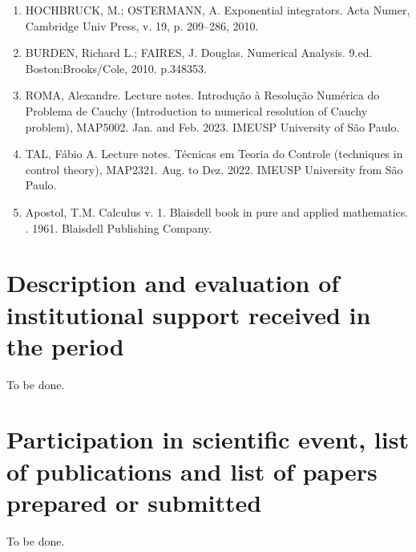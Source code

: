 \documentclass[letterpaper,10pt,english]{jupyterBook}
\begin{document}
\sphinxstepscope
\begin{enumerate}
%
\item {} 
\sphinxAtStartPar
HOCHBRUCK, M.; OSTERMANN, A. Exponential integrators. Acta Numer, Cambridge Univ Press, v. 19, p. 209–286, 2010.

\item {} 
\sphinxAtStartPar
BURDEN, Richard L.; FAIRES, J. Douglas. Numerical Analysis. 9.ed. Boston:Brooks/Cole, 2010. p.348\sphinxhyphen{}353.

\item {} 
\sphinxAtStartPar
ROMA, Alexandre. Lecture notes. Introdução à Resolução Numérica do Problema de Cauchy (Introduction to numerical resolution of Cauchy problem), MAP5002. Jan. and Feb. 2023. IME\sphinxhyphen{}USP University of São Paulo.

\item {} 
\sphinxAtStartPar
TAL, Fábio A. Lecture notes. Técnicas em Teoria do Controle (techniques in control theory), MAP2321. Aug. to Dez. 2022. IME\sphinxhyphen{}USP University from São Paulo.

\item {} 
\sphinxAtStartPar
Apostol, T.M. Calculus v. 1. Blaisdell book in pure and applied mathematics. . 1961. Blaisdell Publishing Company.

\end{enumerate}

\sphinxstepscope


\chapter{Description and evaluation of institutional support received in the period}
\label{\detokenize{Description_and_evaluation_of_institutional_support_received_in_the_period:description-and-evaluation-of-institutional-support-received-in-the-period}}\label{\detokenize{Description_and_evaluation_of_institutional_support_received_in_the_period::doc}}
\sphinxAtStartPar
To be done.

\sphinxstepscope


\chapter{Participation in scientific event, list of publications and list of papers prepared or submitted}
\label{\detokenize{Participation_in_scientific_event,_list_of_publications_and_list_of_papers_prepared_or_submitted:participation-in-scientific-event-list-of-publications-and-list-of-papers-prepared-or-submitted}}\label{\detokenize{Participation_in_scientific_event,_list_of_publications_and_list_of_papers_prepared_or_submitted::doc}}
\sphinxAtStartPar
To be done.







\renewcommand{\indexname}{Index}
\printindex
\end{document}
